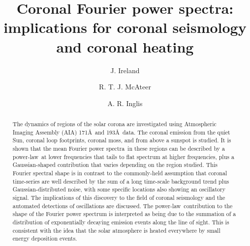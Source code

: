 \documentclass[onecolumn]{emulateapj}
\newcommand{\PA}{power spectra}
\newcommand{\PL}{power-law}
\newcommand{\mFpa}{mean Fourier \PA}
\newcommand{\BF}{ }
\begin{document}

\title{Coronal Fourier power spectra: implications for coronal
  seismology and coronal heating}


\author{J. Ireland}

\author{R. T. J. McAteer}

\author{A. R. Inglis}


\begin{abstract}

  {\BF The dynamics of regions of the solar corona are investigated
    using {\BF Atmospheric Imaging Assembly (AIA)} 171\AA\ and
    193\AA\ data.  The coronal emission from the quiet Sun, coronal
    loop footprints, coronal moss, and from above a sunspot is
    studied.  It is shown that the \mFpa\ in these regions can be
    described by a \PL\ at lower frequencies that tails to flat
    spectrum at higher frequencies, plus a Gaussian-shaped
    contribution that varies depending on the region studied. This
    Fourier spectral shape is in contrast to the commonly-held
    assumption that coronal time-series are well described by the sum
    of a long time-scale background trend plus Gaussian-distributed
    noise, with some specific locations also showing an oscillatory
    signal.  The implications of this discovery to the field of
    coronal seismology and the automated detections of oscillations
    are discussed.  The \PL\ contribution to the shape of the Fourier
    power spectrum is interpreted as being due to the summation of a
    distribution of exponentially decaying emission events along the
    line of sight.}  This is consistent with the idea that the solar
  atmosphere is heated everywhere by small energy deposition events.
\end{abstract}
\end{document}
